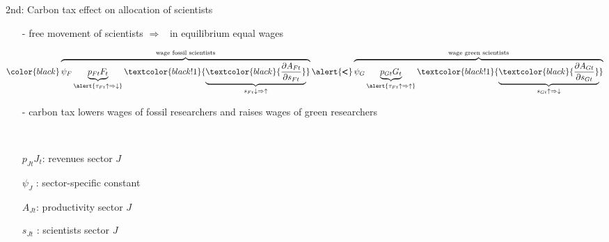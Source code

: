 \documentclass[11pt,aspectratio=169]{beamer}
\newcommand{\ar}{$\Rightarrow$ \ }
\begin{document}
\addtocounter{framenumber}{-1}

\begin{frame}{2nd: Carbon tax effect on \alert{allocation of scientists}}
		\begin{itemize}
		\item[-] free movement of scientists \ar in equilibrium equal wages
	\end{itemize}
	\vspace{0mm}
	\large
	\begin{align*}
		\color{black}
		\overbrace{{\psi_F} \underbrace{p_{Ft}{F_t}}_{{\alert{\tau_{Ft}\uparrow\Rightarrow\downarrow}}}\textcolor{black!1}{\underbrace{\textcolor{black}{\frac{\partial A_{Ft}}{\partial s_{Ft}}}}_{{{s_{Ft}\downarrow\Rightarrow\uparrow}}}}}^{\text{wage fossil scientists}}\alert{\pmb{<}}\overbrace{{\psi_G} \underbrace{p_{Gt}{G_t}}_{{\alert{\tau_{Ft}\uparrow\Rightarrow\uparrow}}}\textcolor{black!1}{\underbrace{\textcolor{black}{\frac{\partial A_{Gt}}{\partial s_{Gt}}}}_{	{{s_{Gt}\uparrow\Rightarrow\downarrow}}}}}^{\text{wage green scientists}}
	\end{align*}
	\normalsize
	\vspace{-2mm}
	\begin{itemize}
		\item[-] carbon tax lowers wages of fossil researchers and raises wages of green researchers
		\vspace{1mm}
		\item[] \  %
	\end{itemize}
	\small
	\vspace{4mm}
	\hspace{-2mm}
	\begin{minipage}[t!]{0.4\textwidth}
		\vspace{0mm}
		\begin{itemize}
			\item[] $p_{Jt}J_t$: revenues sector $J$
			\vspace{-2mm}
			\item[] $\psi_J$ : sector-specific constant
		\end{itemize}
	\end{minipage}
	\vspace{-5mm}
	\begin{minipage}[t!]{0.5\textwidth}
		\vspace{0mm}
		\begin{itemize}	
			\item[] $A_{Jt}$: productivity sector $J$
			\vspace{-2mm}			
			\item[] $s_{Jt}$ : scientists sector $J$
		\end{itemize}
	\end{minipage}
	

\end{frame}
\end{document}
